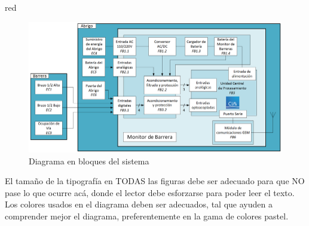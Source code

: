 \begin{consigna}{red}
\begin{figure}[htpb]
\centering
\includegraphics[width=1\textwidth]{./assets/diagBloques.png}
\caption{Diagrama en bloques del sistema}
\label{fig:diagBloques}
\end{figure}

\vspace{25px}

El tamaño de la tipografía en TODAS las figuras debe ser adecuado para que NO pase lo que ocurre acá, donde el lector debe esforzarse para poder leer el texto. Los colores usados en el diagrama deben ser adecuados, tal que ayuden a comprender mejor el diagrama, preferentemente en la gama de colores pastel.
\end{consigna}

